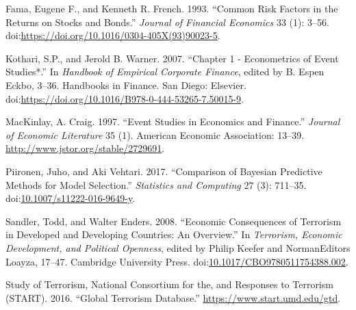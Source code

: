 \documentclass[]{AEA}
\begin{document}
\hypertarget{ref-FAMA19933}{}
Fama, Eugene F., and Kenneth R. French. 1993. ``Common Risk Factors in
the Returns on Stocks and Bonds.'' \emph{Journal of Financial Economics}
33 (1): 3--56.
doi:\href{https://doi.org/https://doi.org/10.1016/0304-405X(93)90023-5}{https://doi.org/10.1016/0304-405X(93)90023-5}.

\hypertarget{ref-Kothari20073}{}
Kothari, S.P., and Jerold B. Warner. 2007. ``Chapter 1 - Econometrics of
Event Studies*.'' In \emph{Handbook of Empirical Corporate Finance},
edited by B. Espen Eckbo, 3--36. Handbooks in Finance. San Diego:
Elsevier.
doi:\href{https://doi.org/https://doi.org/10.1016/B978-0-444-53265-7.50015-9}{https://doi.org/10.1016/B978-0-444-53265-7.50015-9}.

\hypertarget{ref-10.2307ux2f2729691}{}
MacKinlay, A. Craig. 1997. ``Event Studies in Economics and Finance.''
\emph{Journal of Economic Literature} 35 (1). American Economic
Association: 13--39. \url{http://www.jstor.org/stable/2729691}.

\hypertarget{ref-Piironen2017}{}
Piironen, Juho, and Aki Vehtari. 2017. ``Comparison of Bayesian
Predictive Methods for Model Selection.'' \emph{Statistics and
Computing} 27 (3): 711--35.
doi:\href{https://doi.org/10.1007/s11222-016-9649-y}{10.1007/s11222-016-9649-y}.

\hypertarget{ref-sandler_enders_2008}{}
Sandler, Todd, and Walter Enders. 2008. ``Economic Consequences of
Terrorism in Developed and Developing Countries: An Overview.'' In
\emph{Terrorism, Economic Development, and Political Openness}, edited
by Philip Keefer and NormanEditors Loayza, 17--47. Cambridge University
Press.
doi:\href{https://doi.org/10.1017/CBO9780511754388.002}{10.1017/CBO9780511754388.002}.

\hypertarget{ref-GTD}{}
Study of Terrorism, National Consortium for the, and Responses to
Terrorism (START). 2016. ``Global Terrorism Database.''
\url{https://www.start.umd.edu/gtd}.
\end{document}
